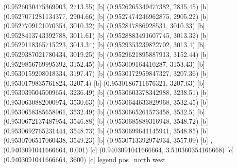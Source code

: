 {{{(0.9526030475369903, 2713.55) [b] 
(0.9526265349477382, 2835.45) [b] 
(0.9527071281134377, 2904.66) [b] 
(0.9527474246962875, 2905.22) [b] 
(0.9527709121070354, 3010.32) [b] 
(0.952817886928531, 3010.33) [b] 
(0.9528413743392788, 3011.61) [b] 
(0.9528883491607745, 3013.32) [b] 
(0.9529118365715223, 3013.34) [b] 
(0.9529353239822702, 3013.4) [b] 
(0.9529387021780434, 3019.25) [b] 
(0.9529621895887913, 3152.44) [b] 
(0.9529856769995392, 3152.45) [b] 
(0.953009164410287, 3153.43) [b] 
(0.9530159208018334, 3197.47) [b] 
(0.9530172959847327, 3207.36) [b] 
(0.9530179835761824, 3207.4) [b] 
(0.9530186711676321, 3207.63) [b] 
(0.9530395045009654, 3236.49) [b] 
(0.9530603378342988, 3238.51) [b] 
(0.9530630882000974, 3530.63) [b] 
(0.9530644633829968, 3532.45) [b] 
(0.9530658385658961, 3532.49) [b] 
(0.9530665261573458, 3532.5) [b] 
(0.9530672137487954, 3546.88) [b] 
(0.9530685889316948, 3548.72) [b] 
(0.9530692765231444, 3548.73) [b] 
(0.9530699641145941, 3548.85) [b] 
(0.9530706517060438, 3549.23) [b] 
(0.9530713392974934, 3557.09) [b] 
},{(0.9403091041666664, 0.001) [c] 
(0.9403091041666664, 3.510360354166668) [c] 
(0.9403091041666664, 3600) [c] 
}}}{legend pos=north west}
